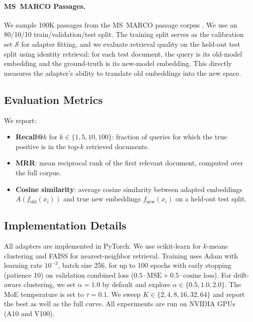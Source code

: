 \documentclass[11pt,a4paper]{article}
\newcommand{\fold}{f_{\mathrm{old}}}
\newcommand{\fnew}{f_{\mathrm{new}}}
\begin{document}
\paragraph{MS~MARCO Passages.}
We sample 100K passages from the MS~MARCO passage corpus \citep{nguyen2016msmarco}.
We use an 80/10/10 train/validation/test split.
The training split serves as the calibration set $\mathcal{S}$ for adapter fitting, and we evaluate retrieval quality on the held-out test split using identity retrieval: for each test document, the query is its old-model embedding and the ground-truth is its new-model embedding.
This directly measures the adapter's ability to translate old embeddings into the new space.

\subsection{Evaluation Metrics}
\label{sec:experiments:metrics}

We report:
\begin{itemize}[leftmargin=*,itemsep=1pt]
  \item \textbf{Recall@$k$} for $k \in \{1, 5, 10, 100\}$: fraction of queries for which the true positive is in the top-$k$ retrieved documents.
  \item \textbf{MRR}: mean reciprocal rank of the first relevant document, computed over the full corpus.
  \item \textbf{Cosine similarity}: average cosine similarity between adapted embeddings $A(\fold(x_i))$ and true new embeddings $\fnew(x_i)$ on a held-out test split.
\end{itemize}

\subsection{Implementation Details}
\label{sec:experiments:impl}

All adapters are implemented in PyTorch.
We use scikit-learn for $k$-means clustering and FAISS \citep{johnson2019faiss} for nearest-neighbor retrieval.
Training uses Adam with learning rate $10^{-3}$, batch size 256, for up to 100 epochs with early stopping (patience 10) on validation combined loss ($0.5 \cdot \text{MSE} + 0.5 \cdot \text{cosine loss}$).
For drift-aware clustering, we set $\alpha = 1.0$ by default and explore $\alpha \in \{0.5, 1.0, 2.0\}$.
The MoE temperature is set to $\tau = 0.1$.
We sweep $K \in \{2, 4, 8, 16, 32, 64\}$ and report the best as well as the full curve.
All experiments are run on NVIDIA GPUs (A10 and V100).
\end{document}
